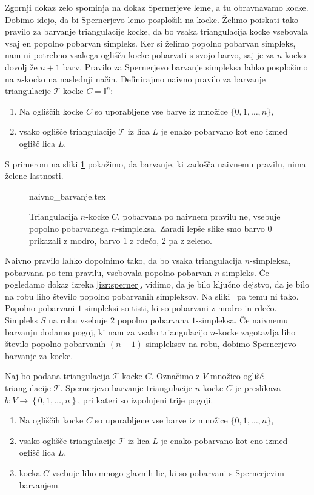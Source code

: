 \documentclass[mat1]{fmfdelo}
\newcommand{\I}{\mathbb I}
\newcommand{\0}{\underline{0}}
\newcommand{\pT}{\mathcal T}
\begin{document}
Zgornji dokaz zelo spominja na dokaz Spernerjeve leme, a tu obravnavamo kocke. Dobimo idejo, da bi Spernerjevo lemo posplošili na kocke. Želimo poiskati tako pravilo za barvanje triangulacije kocke, da bo vsaka triangulacija kocke vsebovala vsaj en popolno pobarvan simpleks. Ker si želimo popolno pobarvan simpleks, nam ni potrebno vsakega oglišča kocke pobarvati s svojo barvo, saj je za $n$-kocko dovolj že $n+1$ barv.  Pravilo za Spernerjevo barvanje simpleksa lahko posplošimo na $n$-kocko na naslednji način.
Definirajmo naivno pravilo za barvanje triangulacije $\pT$ kocke $C=\I^n$:
\begin{enumerate}
\item Na ogliščih kocke $C$ so uporabljene vse barve iz množice $\{0, 1, \dots, n \}$,
\item vsako oglišče triangulacije $\pT$ iz lica $L$ je enako pobarvano kot eno izmed oglišč lica $L$.
\end{enumerate}
S primerom na sliki \ref{fig:ni-pop} pokažimo, da barvanje, ki zadošča naivnemu pravilu, nima želene lastnosti.
\begin{figure}[h!]
	\centering
	{naivno_barvanje.tex}
	\caption{Triangulacija $n$-kocke $C$, pobarvana po naivnem pravilu ne, vsebuje popolno pobarvanega $n$-simpleksa. Zaradi lepše slike smo barvo $0$ prikazali z modro, barvo $1$ z rdečo, $2$ pa z zeleno.}\label{fig:ni-pop}
\end{figure}
Naivno pravilo lahko dopolnimo tako, da bo vsaka triangulacija $n$-simpleksa, pobarvana po tem pravilu, vsebovala popolno pobarvan $n$-simpleks. Če pogledamo dokaz izreka \ref{izr:sperner}, vidimo, da je bilo ključno dejstvo, da je bilo na robu liho število popolno pobarvanih simpleksov. Na sliki~\label{fig:ni-pop} pa temu ni tako. Popolno pobarvani $1$-simpleksi so tisti, ki so pobarvani z modro in rdečo. Simpleks $S$ na robu vsebuje $2$ popolno pobarvana $1$-simpleksa. Če naivnemu barvanju dodamo pogoj, ki nam za vsako triangulacijo $n$-kocke zagotavlja liho število popolno pobarvanih $(n-1)$-simpleksov na robu, dobimo Spernerjevo barvanje za kocke.
\begin{definicija}\label{def:cubsperner}
Naj bo podana triangulacija $\pT$ kocke $C$. Označimo z $V$ množico oglišč triangulacije $\pT$. Spernerjevo barvanje triangulacije $n$-kocke $C$ je preslikava $b : V \to \left \{ 0, 1, \dots, n \right \}$, pri kateri so izpolnjeni trije pogoji.
\begin{enumerate}
\item Na ogliščih kocke $C$ so uporabljene vse barve iz množice $\{0, 1, \dots, n \}$, \label{sperner1}
\item vsako oglišče triangulacije $\pT$ iz lica $L$ je enako pobarvano kot eno izmed oglišč lica $L$,\label{sperner2}
\item kocka $C$ vsebuje liho mnogo glavnih lic, ki so pobarvani s Spernerjevim barvanjem.\label{sperner3}
\end{enumerate}
\end{definicija}
\end{document}
